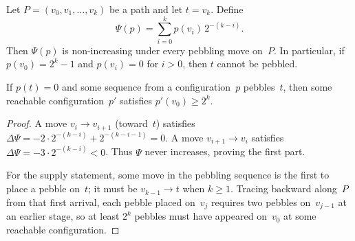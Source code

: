 
\begin{lemma}\label{lem:path-lb}
Let $P=(v_0,v_1,\ldots,v_k)$ be a path and let $t=v_k$.
Define
\[
\Psi(p)=\sum_{i=0}^{k} p(v_i)\,2^{-(k-i)}.
\]
Then $\Psi(p)$ is non-increasing under every pebbling move on~$P$.
In particular, if $p(v_0)=2^k-1$ and $p(v_i)=0$ for $i>0$, then $t$ cannot be pebbled.

If $p(t)=0$ and some sequence from a configuration~$p$ pebbles~$t$, then some
reachable configuration~$p'$ satisfies $p'(v_0)\ge 2^k$.
\end{lemma}

\begin{proof}
A move $v_i\to v_{i+1}$ (toward~$t$) satisfies
$\Delta\Psi = -2\cdot 2^{-(k-i)}+2^{-(k-i-1)}=0$.
A move $v_{i+1}\to v_i$ satisfies $\Delta\Psi=-3\cdot 2^{-(k-i)}<0$.
Thus $\Psi$ never increases, proving the first part.

For the supply statement, some move in the pebbling sequence is the first to place
a pebble on~$t$; it must be $v_{k-1}\to t$ when $k\ge 1$.
Tracing backward along~$P$ from that first arrival, each pebble placed on~$v_j$
requires two pebbles on~$v_{j-1}$ at an earlier stage, so at least $2^k$ pebbles
must have appeared on~$v_0$ at some reachable configuration.
\end{proof}
